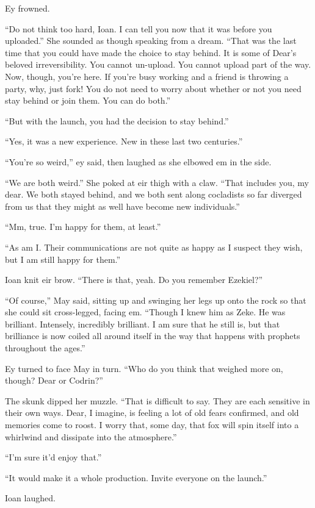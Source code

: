 Ey frowned.

``Do not think too hard, Ioan. I can tell you now that it was before you uploaded.'' She sounded as though speaking from a dream. ``That was the last time that you could have made the choice to stay behind. It is some of Dear's beloved irreversibility. You cannot un-upload. You cannot upload part of the way. Now, though, you're here. If you're busy working and a friend is throwing a party, why, just fork! You do not need to worry about whether or not you need stay behind or join them. You can do both.''

``But with the launch, you had the decision to stay behind.''

``Yes, it was a new experience. New in these last two centuries.''

``You're so weird,'' ey said, then laughed as she elbowed em in the side.

``We are both weird.'' She poked at eir thigh with a claw. ``That includes you, my dear. We both stayed behind, and we both sent along cocladists so far diverged from us that they might as well have become new individuals.''

``Mm, true. I'm happy for them, at least.''

``As am I. Their communications are not quite as happy as I suspect they wish, but I am still happy for them.''

Ioan knit eir brow. ``There is that, yeah. Do you remember Ezekiel?''

``Of course,'' May said, sitting up and swinging her legs up onto the rock so that she could sit cross-legged, facing em. ``Though I knew him as Zeke. He was brilliant. Intensely, incredibly brilliant. I am sure that he still is, but that brilliance is now coiled all around itself in the way that happens with prophets throughout the ages.''

Ey turned to face May in turn. ``Who do you think that weighed more on, though? Dear or Codrin?''

The skunk dipped her muzzle. ``That is difficult to say. They are each sensitive in their own ways. Dear, I imagine, is feeling a lot of old fears confirmed, and old memories come to roost. I worry that, some day, that fox will spin itself into a whirlwind and dissipate into the atmosphere.''

``I'm sure it'd enjoy that.''

``It would make it a whole production. Invite everyone on the launch.''

Ioan laughed.

